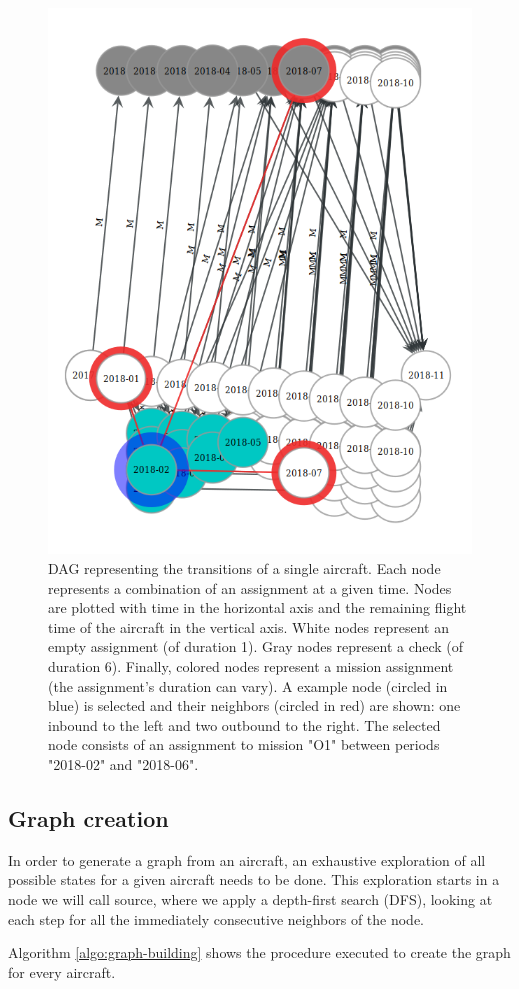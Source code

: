 \documentclass[a4paper,11pt]{article}
\begin{document}
    \begin{figure}
        \centering
        \includegraphics[height=0.7 \linewidth]{example_graph_1.png}
        \caption{DAG representing the transitions of a single aircraft. Each node represents a combination of an assignment at a given time. Nodes are plotted with time in the horizontal axis and the remaining flight time of the aircraft in the vertical axis. White nodes represent an empty assignment (of duration 1). Gray nodes represent a check (of duration 6). Finally, colored nodes represent a mission assignment (the assignment's duration can vary). A example node (circled in blue) is selected and their neighbors (circled in red) are shown: one inbound to the left and two outbound to the right. The selected node consists of an assignment to mission "O1" between periods "2018-02" and "2018-06".} \label{fig:graph_resource1}
    \end{figure}

  \subsection{Graph creation}

    In order to generate a graph from an aircraft, an exhaustive exploration of all possible states for a given aircraft needs to be done. This exploration starts in a node we will call source, where we apply a depth-first search (DFS), looking at each step for all the immediately consecutive neighbors of the node.

    Algorithm \ref{algo:graph-building} shows the procedure executed to create the graph for every aircraft. 
\end{document}
